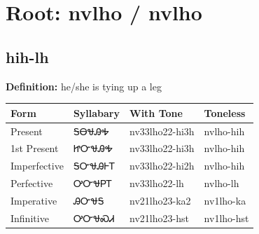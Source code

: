 \documentclass{article}%
\begin{document}
%
\normalsize%
\section*{Root: nvlho / nvlho}%
\subsection*{hih-lh}%
\textbf{Definition: }%
he/she is tying up a leg%
\\[0.5em]%
\begin{tabular}{|l|l|l|l|}%
\hline%
\textbf{Form}&\textbf{Syllabary}&\textbf{With Tone}&\textbf{Toneless}\\%
\hline%
Present&ᎦᎾᏠᎯᎭ&nv33lho22{-}hi3h&nvlho{-}hih\\%
1st Present&ᏥᏅᏠᎯᎭ&nv33lho22{-}hi3h&nvlho{-}hih\\%
Imperfective&ᎦᏅᏠᎯᎰᎢ&nv33lho22{-}hi2h&nvlho{-}hih\\%
Perfective&ᎤᏅᏠᏢᎢ&nv33lho22{-}lh&nvlho{-}lh\\%
Imperative&ᎯᏅᏠᎦ&nv21lho23{-}ka2&nv1lho{-}ka\\%
Infinitive&ᎤᏅᏠᏍᏗ&nv21lho23{-}hst&nv1lho{-}hst\\%
\hline%
\end{tabular}%
\\[1em]%
\end{document}
